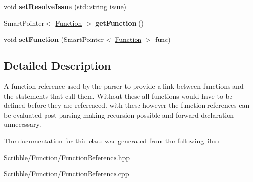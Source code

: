 \begin{DoxyCompactItemize}
\item 
\hypertarget{class_function_reference_ac33cbbbd81f2597850ee468373bbff7a}{void {\bfseries set\-Resolve\-Issue} (std\-::string issue)}\label{class_function_reference_ac33cbbbd81f2597850ee468373bbff7a}

\item 
\hypertarget{class_function_reference_a3b23d742c7a888145cd648e546257053}{Smart\-Pointer$<$ \hyperlink{class_a_p_i_1_1_function}{Function} $>$ {\bfseries get\-Function} ()}\label{class_function_reference_a3b23d742c7a888145cd648e546257053}

\item 
\hypertarget{class_function_reference_a3a985dd76aa50979f2febbc400964b20}{void {\bfseries set\-Function} (Smart\-Pointer$<$ \hyperlink{class_a_p_i_1_1_function}{Function} $>$ func)}\label{class_function_reference_a3a985dd76aa50979f2febbc400964b20}

\end{DoxyCompactItemize}


\subsection{Detailed Description}
A function reference used by the parser to provide a link between functions and the statements that call them. Without these all functions would have to be defined before they are referenced. with these however the function references can be evaluated post parsing making recursion possible and forward declaration unnecessary. 

The documentation for this class was generated from the following files\-:\begin{DoxyCompactItemize}
\item 
Scribble/\-Function/Function\-Reference.\-hpp\item 
Scribble/\-Function/Function\-Reference.\-cpp\end{DoxyCompactItemize}
